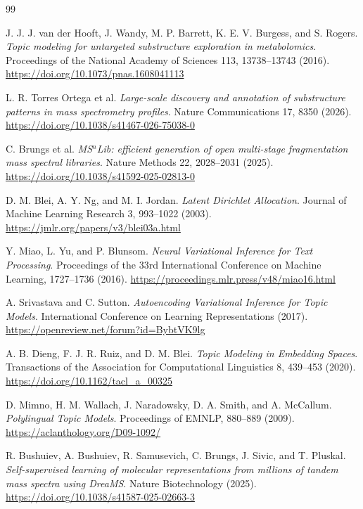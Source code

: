 \documentclass[10pt,a4paper]{article}
\begin{document}
\begin{thebibliography}{99}

J. J. J. van der Hooft, J. Wandy, M. P. Barrett, K. E. V. Burgess, and
S. Rogers. \emph{Topic modeling for untargeted substructure exploration in
metabolomics}. Proceedings of the National Academy of Sciences 113,
13738--13743 (2016).
\url{https://doi.org/10.1073/pnas.1608041113}

L. R. Torres Ortega et al. \emph{Large-scale discovery and annotation of
substructure patterns in mass spectrometry profiles}.
Nature Communications 17, 8350 (2026).
\url{https://doi.org/10.1038/s41467-026-75038-0}

C. Brungs et al. \emph{MS$^{n}$Lib: efficient generation of open multi-stage
fragmentation mass spectral libraries}. Nature Methods 22,
2028--2031 (2025).
\url{https://doi.org/10.1038/s41592-025-02813-0}

D. M. Blei, A. Y. Ng, and M. I. Jordan. \emph{Latent Dirichlet Allocation}.
Journal of Machine Learning Research 3, 993--1022 (2003).
\url{https://jmlr.org/papers/v3/blei03a.html}

Y. Miao, L. Yu, and P. Blunsom. \emph{Neural Variational Inference for Text
Processing}. Proceedings of the 33rd International Conference on Machine
Learning, 1727--1736 (2016).
\url{https://proceedings.mlr.press/v48/miao16.html}

A. Srivastava and C. Sutton. \emph{Autoencoding Variational Inference for Topic
Models}. International Conference on Learning Representations (2017).
\url{https://openreview.net/forum?id=BybtVK9lg}

A. B. Dieng, F. J. R. Ruiz, and D. M. Blei. \emph{Topic Modeling in Embedding
Spaces}. Transactions of the Association for Computational Linguistics 8,
439--453 (2020).
\url{https://doi.org/10.1162/tacl_a_00325}

D. Mimno, H. M. Wallach, J. Naradowsky, D. A. Smith, and A. McCallum.
\emph{Polylingual Topic Models}. Proceedings of EMNLP, 880--889 (2009).
\url{https://aclanthology.org/D09-1092/}

R. Bushuiev, A. Bushuiev, R. Samusevich, C. Brungs, J. Sivic, and T. Pluskal.
\emph{Self-supervised learning of molecular representations from millions
of tandem mass spectra using DreaMS}. Nature Biotechnology (2025).
\url{https://doi.org/10.1038/s41587-025-02663-3}


\end{thebibliography}
\end{document}
